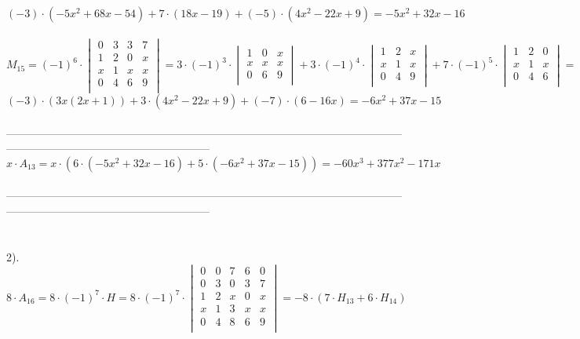 \documentclass[a4paper, 12pt]{article}
\begin{document}
    \[
        (-3) \cdot (- 5 x^{2} + 68 x - 54) + 7 \cdot (18 x - 19) + (-5) \cdot (4 x^{2} - 22 x + 9) =    
        - 5 x^{2} + 32 x - 16    
    \]
    \\
    \[
        M_{15} = (-1)^6 \cdot \begin{vmatrix}
            0 & 3 & 3 & 7 \\
            1 & 2 & 0 & x \\
            x & 1 & x & x \\
            0 & 4 & 6 & 9 \\
        \end{vmatrix} = 3 \cdot (-1)^3 \cdot  \begin{vmatrix}
            1 & 0 & x \\
            x & x & x \\
            0 & 6 & 9 \\
        \end{vmatrix} + 3 \cdot (-1)^4 \cdot \begin{vmatrix}
            1 & 2 & x \\
            x & 1 & x \\
            0 & 4 & 9 \\
        \end{vmatrix}  + 7 \cdot (-1)^5 \cdot \begin{vmatrix}
            1 & 2 & 0 \\
            x & 1 & x \\
            0 & 4 & 6 \\
        \end{vmatrix} = 
    \]
    \[
        (-3) \cdot (3 x (2 x + 1)) + 3 \cdot (4 x^{2} - 22 x + 9) + (-7) \cdot (6 - 16 x)  = - 6 x^{2} + 37 x - 15 
    \]
    \\ --------------------------------------------------------------------------------------------------------------------------------------------------------------------
    \[
        x \cdot A_{13} = x \cdot (6 \cdot (- 5 x^{2} + 32 x - 16) + 5 \cdot ( - 6 x^{2} + 37 x - 15))  = -60x^{3} + 377x^2 - 171x  
    \]
    \\ --------------------------------------------------------------------------------------------------------------------------------------------------------------------
    \\
    \\
    \\ 2). $8 \cdot A_{16} = 8 \cdot (-1)^{7} \cdot H = 8 \cdot (-1)^{7} \cdot \begin{vmatrix}
        0 & 0 & 7 & 6 & 0 \\
        0 & 3 & 0 & 3 & 7 \\
        1 & 2 & x & 0 & x \\
        x & 1 & 3 & x & x \\
        0 & 4 & 8 & 6 & 9 \\
    \end{vmatrix} = -8 \cdot (7 \cdot H_{13} + 6 \cdot H_{14})$
\end{document}
